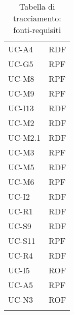 \begin{longtable}{| p{5cm} | p{5cm} |}
		\rowcolor{LightGray}
		UC-A4 & RDF \\
		UC-G5 & RPF\\
		\rowcolor{LightGray}
		UC-M8 & RPF\\
		UC-M9 & RPF\\
		\rowcolor{LightGray}
		UC-I13 & RDF \\
		UC-M2 & RDF \\
		UC-M2.1 & RDF \\
		\rowcolor{LightGray}
		UC-M3 & RPF \\
		UC-M5 & RDF \\
		\rowcolor{LightGray}
		UC-M6 & RPF \\
		UC-I2 & RDF \\
		\rowcolor{LightGray}
		UC-R1 & RDF \\
		UC-S9 & RDF \\
		\rowcolor{LightGray}
		UC-S11 & RPF \\
		UC-R4 & RDF \\
		\rowcolor{LightGray}
		UC-I5 & ROF\\
		UC-A5 & RPF\\
		\rowcolor{LightGray}
		UC-N3 & ROF\\
		\hline
		\caption{Tabella di tracciamento: fonti-requisiti}
\end{longtable}
\newpage
